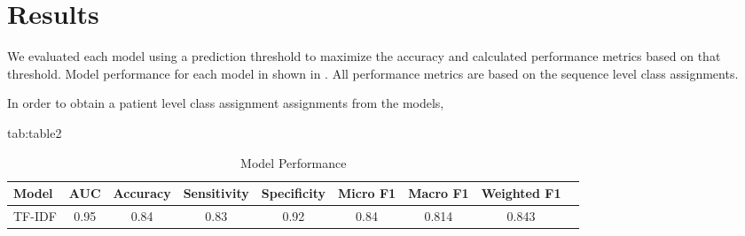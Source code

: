 \documentclass[pmlr,twocolumn,10pt]{jmlr} %
\begin{document}
\section{Results}
\label{sec:Results}  

We evaluated each model using a prediction threshold to maximize the accuracy and calculated performance metrics based on that threshold. Model performance for each model in shown in . All performance metrics are based on the sequence level class assignments. %

In order to obtain a patient level class assignment assignments from the models,  %

\begin{table*}[hbtp]
\floatconts
{tab:table2}
  {\begin{tabular}{lcccccccc}
    \toprule 
    \bfseries Model & \bfseries AUC & \bfseries Accuracy & \bfseries Sensitivity & \bfseries Specificity & \bfseries Micro F1  & \bfseries Macro F1 & \bfseries Weighted F1 \\ 
    \midrule
    TF-IDF & 0.95 & 0.84 & 0.83 & 0.92 & 0.84 & 0.814 & 0.843 \\
    \bottomrule
  \end{tabular}}
  {\caption{Model Performance}}
\end{table*}
\end{document}
